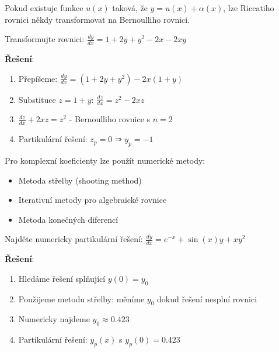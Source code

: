 \vspace{0.8\baselineskip}

\begin{method}
\label{met:transformace-bernoulli}
Pokud existuje funkce $u(x)$ taková, že $y = u(x) + \alpha(x)$, lze Riccatiho rovnici někdy transformovat na Bernoulliho rovnici.
\end{method}

\vspace{0.6\baselineskip}

\begin{example}
\label{ex:redukce-bernoulli}
Transformujte rovnici: $\frac{dy}{dx} = 1 + 2y + y^2 - 2x - 2xy$

\textbf{Řešení}:
\begin{enumerate}
\item Přepíšeme: $\frac{dy}{dx} = (1 + 2y + y^2) - 2x(1 + y)$
\item Substituce $z = 1 + y$: $\frac{dz}{dx} = z^2 - 2xz$
\item $\frac{dz}{dx} + 2xz = z^2$ - Bernoulliho rovnice s $n = 2$
\item Partikulární řešení: $z_p = 0$ ⇒ $y_p = -1$
\end{enumerate}
\end{example}

\vspace{0.8\baselineskip}

\begin{method}
\label{met:numericke-partikularni}
Pro komplexní koeficienty lze použít numerické metody:
\begin{itemize}
\item Metoda střelby (shooting method)
\item Iterativní metody pro algebraické rovnice
\item Metoda konečných diferencí
\end{itemize}
\end{method}

\vspace{0.6\baselineskip}

\begin{example}
\label{ex:numericke-partikularni}
Najděte numericky partikulární řešení: $\frac{dy}{dx} = e^{-x} + \sin(x)y + xy^2$

\textbf{Řešení}:
\begin{enumerate}
\item Hledáme řešení splňující $y(0) = y_0$
\item Použijeme metodu střelby: měníme $y_0$ dokud řešení nesplní rovnici
\item Numericky najdeme $y_0 \approx 0.423$
\item Partikulární řešení: $y_p(x)$ s $y_p(0) = 0.423$
\end{enumerate}
\end{example}

